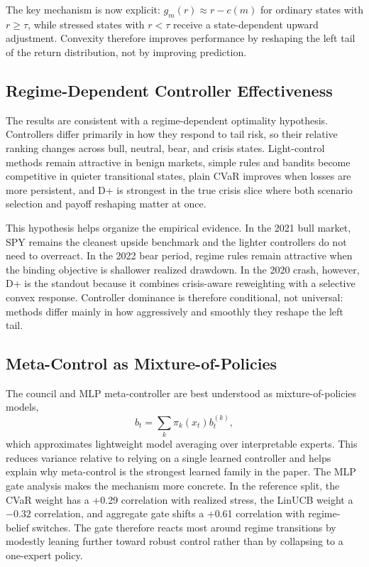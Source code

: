 \documentclass[11pt]{article}
\begin{document}
The key mechanism is now explicit: $g_m(r)\approx r-c(m)$ for ordinary states
with $r\ge\tau$, while stressed states with $r<\tau$ receive a state-dependent
upward adjustment. Convexity therefore improves performance by reshaping the
left tail of the return distribution, not by improving prediction.

\subsection{Regime-Dependent Controller Effectiveness}

The results are consistent with a regime-dependent optimality hypothesis.
Controllers differ primarily in how they respond to tail risk, so their
relative ranking changes across bull, neutral, bear, and crisis states.
Light-control methods remain attractive in benign markets, simple rules and
bandits become competitive in quieter transitional states, plain CVaR improves
when losses are more persistent, and D+ is strongest in the true crisis slice
where both scenario selection and payoff reshaping matter at once.

This hypothesis helps organize the empirical evidence. In the 2021 bull market,
SPY remains the cleanest upside benchmark and the lighter controllers do not
need to overreact. In the 2022 bear period, regime rules remain attractive
when the binding objective is shallower realized drawdown. In the 2020 crash,
however, D+ is the standout because it combines crisis-aware reweighting with a
selective convex response. Controller dominance is therefore conditional, not
universal: methods differ mainly in how aggressively and smoothly they reshape
the left tail.

\subsection{Meta-Control as Mixture-of-Policies}

The council and MLP meta-controller are best understood as
mixture-of-policies models,
\[
b_t = \sum_k \pi_k(x_t) b_t^{(k)},
\]
which approximates lightweight model averaging over interpretable experts. This
reduces variance relative to relying on a single learned controller and helps explain why meta-control is the strongest learned family in the paper. The MLP gate analysis makes the mechanism more concrete. In the reference split, the CVaR weight has a +0.29 correlation with realized stress, the LinUCB weight a $-0.32$ correlation, and aggregate gate shifts a +0.61 correlation with regime-belief switches. The gate therefore reacts most around regime transitions by modestly leaning further toward robust control rather than by collapsing to a one-expert policy.
\end{document}
